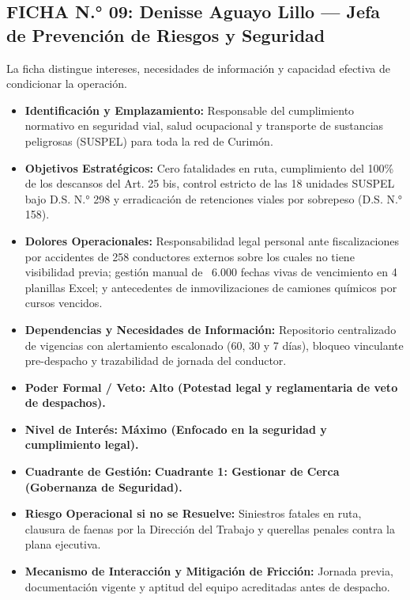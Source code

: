 \subsection*{FICHA N.° 09: Denisse Aguayo Lillo — Jefa de Prevención de Riesgos y Seguridad}
La ficha distingue intereses, necesidades de información y capacidad efectiva de condicionar la operación.
\begin{itemize}
\item \textbf{Identificación y Emplazamiento:} Responsable del cumplimiento normativo en seguridad vial, salud ocupacional y transporte de sustancias peligrosas (SUSPEL) para toda la red de Curimón.
\item \textbf{Objetivos Estratégicos:} Cero fatalidades en ruta, cumplimiento del 100\% de los descansos del Art. 25 bis, control estricto de las 18 unidades SUSPEL bajo D.S. N.° 298 y erradicación de retenciones viales por sobrepeso (D.S. N.° 158).
\item \textbf{Dolores Operacionales:} Responsabilidad legal personal ante fiscalizaciones por accidentes de 258 conductores externos sobre los cuales no tiene visibilidad previa; gestión manual de ~6.000 fechas vivas de vencimiento en 4 planillas Excel; y antecedentes de inmovilizaciones de camiones químicos por cursos vencidos.
\item \textbf{Dependencias y Necesidades de Información:} Repositorio centralizado de vigencias con alertamiento escalonado (60, 30 y 7 días), bloqueo vinculante pre-despacho y trazabilidad de jornada del conductor.
\item \textbf{Poder Formal / Veto:} \textbf{Alto (Potestad legal y reglamentaria de veto de despachos).}
\item \textbf{Nivel de Interés:} \textbf{Máximo (Enfocado en la seguridad y cumplimiento legal).}
\item \textbf{Cuadrante de Gestión:} \textbf{Cuadrante 1: Gestionar de Cerca (Gobernanza de Seguridad).}
\item \textbf{Riesgo Operacional si no se Resuelve:} Siniestros fatales en ruta, clausura de faenas por la Dirección del Trabajo y querellas penales contra la plana ejecutiva.
\item \textbf{Mecanismo de Interacción y Mitigación de Fricción:} Jornada previa, documentación vigente y aptitud del equipo acreditadas antes de despacho.
\end{itemize}
